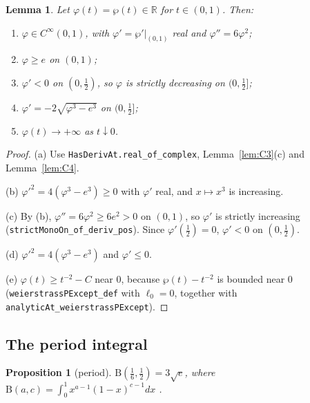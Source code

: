 \documentclass[11pt]{article}
\newtheorem{proposition}[theorem]{Proposition}
\newtheorem{lemma}[theorem]{Lemma}
\theoremstyle{definition}
\theoremstyle{remark}
\newcommand{\R}{\mathbb R}
\newcommand{\lean}[1]{\texttt{#1}}
\begin{document}
\begin{lemma}\label{lem:C5}
Let $\varphi(t)=\wp(t)\in\R$ for $t\in(0,1)$. Then:
\begin{enumerate}
\item[(a)] $\varphi\in C^\infty(0,1)$, with $\varphi'=\wp'|_{(0,1)}$ real and $\varphi''=6\varphi^2$;
\item[(b)] $\varphi\ge e$ on $(0,1)$;
\item[(c)] $\varphi'<0$ on $(0,\tfrac12)$, so $\varphi$ is strictly decreasing on $(0,\tfrac12]$;
\item[(d)] $\varphi'=-2\sqrt{\varphi^3-e^3}$ on $(0,\tfrac12]$;
\item[(e)] $\varphi(t)\to+\infty$ as $t\downarrow0$.
\end{enumerate}
\end{lemma}

\begin{proof}
(a) Use \lean{HasDerivAt.real\_of\_complex}, Lemma~\ref{lem:C3}(c) and
Lemma~\ref{lem:C4}.

(b) $\varphi'^2=4(\varphi^3-e^3)\ge0$ with $\varphi'$ real, and $x\mapsto x^3$ is increasing.

(c) By (b), $\varphi''=6\varphi^2\ge6e^2>0$ on $(0,1)$, so $\varphi'$ is strictly increasing
(\lean{strictMonoOn\_of\_deriv\_pos}). Since $\varphi'(\tfrac12)=0$, $\varphi'<0$ on $(0,\tfrac12)$.

(d) $\varphi'^2=4(\varphi^3-e^3)$ and $\varphi'\le0$.

(e) $\varphi(t)\ge t^{-2}-C$ near $0$, because $\wp(t)-t^{-2}$ is bounded near $0$ (\lean{weierstrassPExcept\_def}
with $\ell_0=0$, together with \lean{analyticAt\_weierstrassPExcept}).
\end{proof}

\subsection{The period integral}

\begin{proposition}[period]\label{prop:C6}
$\mathrm B(\tfrac16,\tfrac12)=3\sqrt e$, where $\mathrm B(a,c)=\int_0^1x^{a-1}(1-x)^{c-1}dx$
.
\end{proposition}
\end{document}
